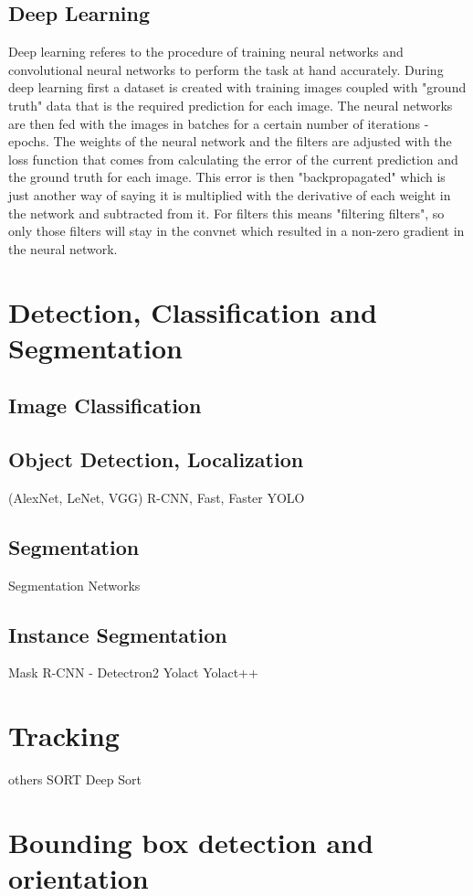 \subsection{Deep Learning}
Deep learning referes to the procedure of training neural networks and
convolutional neural networks to perform the task at hand accurately. During
deep learning first a dataset is created with training images coupled with
"ground truth" data that is the required prediction for each image. The neural
networks are then fed with the images in batches for a certain number of
iterations - epochs. The weights of the neural network and the filters are
adjusted with the loss function that comes from calculating the error of the
current prediction and the ground truth for each image. This error is then
"backpropagated" which is just another way of saying it is multiplied with the
derivative of each weight in the network and subtracted from it. For filters this means
"filtering filters", so only those filters will stay in the convnet which
resulted in a non-zero gradient in the neural network.

\section{Detection, Classification and Segmentation}
\subsection{Image Classification}

\subsection{Object Detection, Localization}
    (AlexNet, LeNet, VGG)
    R-CNN, Fast, Faster
    YOLO
\subsection{Segmentation}
Segmentation Networks
\subsection{Instance Segmentation}
Mask R-CNN - Detectron2
Yolact
Yolact++
\section{Tracking}
others
SORT
Deep Sort
\section{Bounding box detection and orientation}

